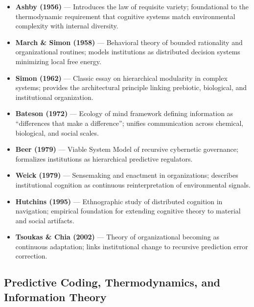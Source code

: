 \documentclass[11pt,a4paper]{article}
\begin{document}
\begin{itemize}
    \item \textbf{Ashby (1956)} — Introduces the law of requisite variety; foundational to the thermodynamic requirement that cognitive systems match environmental complexity with internal diversity.
    \item \textbf{March \& Simon (1958)} — Behavioral theory of bounded rationality and organizational routines; models institutions as distributed decision systems minimizing local free energy.
    \item \textbf{Simon (1962)} — Classic essay on hierarchical modularity in complex systems; provides the architectural principle linking prebiotic, biological, and institutional organization.
    \item \textbf{Bateson (1972)} — Ecology of mind framework defining information as “differences that make a difference”; unifies communication across chemical, biological, and social scales.
    \item \textbf{Beer (1979)} — Viable System Model of recursive cybernetic governance; formalizes institutions as hierarchical predictive regulators.
    \item \textbf{Weick (1979)} — Sensemaking and enactment in organizations; describes institutional cognition as continuous reinterpretation of environmental signals.
    \item \textbf{Hutchins (1995)} — Ethnographic study of distributed cognition in navigation; empirical foundation for extending cognitive theory to material and social artifacts.
    \item \textbf{Tsoukas \& Chia (2002)} — Theory of organizational becoming as continuous adaptation; links institutional change to recursive prediction error correction.
\end{itemize}

\subsection*{Predictive Coding, Thermodynamics, and Information Theory}
\end{document}
